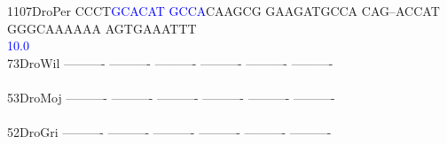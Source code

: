 \documentclass[11pt,twoside,reqno,a4paper]{article}
\begin{document}
{1107\hspace*{1\charwidth}DroPer	CCCT\textcolor{Blue}{G}\textcolor{Blue}{C}\textcolor{Blue}{A}\textcolor{Blue}{C}\textcolor{Blue}{A}\textcolor{Blue}{T}	\textcolor{Blue}{G}\textcolor{Blue}{C}\textcolor{Blue}{C}\textcolor{Blue}{A}CAAGCG	GAAGATGCCA	CAG--ACCAT	GGGCAAAAAA	AGTGAAATTT	\\
\hspace*{5\charwidth}\hspace*{7\charwidth}\hspace*{4\charwidth}\textcolor{Blue}{10.0}\hspace*{1\charwidth}\hspace*{1\charwidth}\hspace*{1\charwidth}\hspace*{1\charwidth}\hspace*{1\charwidth}\hspace*{1\charwidth}\\
73\hspace*{3\charwidth}DroWil	----------	----------	----------	----------	----------	----------	\\
\hspace*{5\charwidth}\hspace*{7\charwidth}\hspace*{1\charwidth}\hspace*{1\charwidth}\hspace*{1\charwidth}\hspace*{1\charwidth}\hspace*{1\charwidth}\hspace*{1\charwidth}\\
53\hspace*{3\charwidth}DroMoj	----------	----------	----------	----------	----------	----------	\\
\hspace*{5\charwidth}\hspace*{7\charwidth}\hspace*{1\charwidth}\hspace*{1\charwidth}\hspace*{1\charwidth}\hspace*{1\charwidth}\hspace*{1\charwidth}\hspace*{1\charwidth}\\
52\hspace*{3\charwidth}DroGri	----------	----------	----------	----------	----------	----------	\\
\hspace*{5\charwidth}\hspace*{7\charwidth}\hspace*{1\charwidth}\hspace*{1\charwidth}\hspace*{1\charwidth}\hspace*{1\charwidth}\hspace*{1\charwidth}\hspace*{1\charwidth}\\
}
\end{document}
